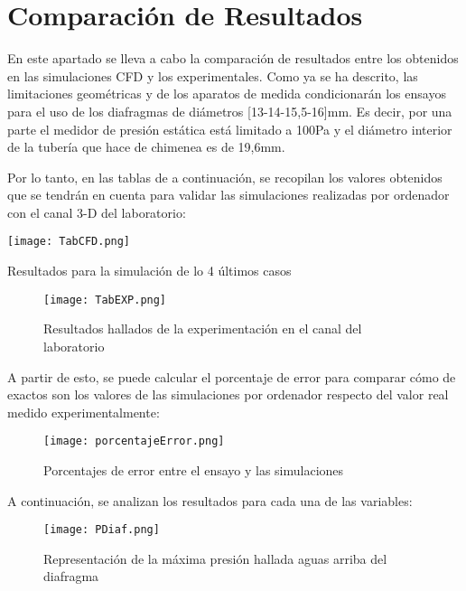 \label{ch:conclusiones}


\section{Comparación de Resultados}\label{sec:comparativa}

En este apartado se lleva a cabo la comparación de resultados entre los
obtenidos en las simulaciones CFD y los experimentales. Como ya se ha
descrito, las limitaciones geométricas y de los aparatos de medida
condicionarán los ensayos para el uso de los diafragmas de diámetros
{[}13-14-15,5-16{]}mm. Es decir, por una parte el medidor de presión
estática está limitado a 100Pa y el diámetro interior de la tubería que
hace de chimenea es de 19,6mm.

Por lo tanto, en las tablas de a continuación, se recopilan los valores
obtenidos que se tendrán en cuenta para validar las simulaciones
realizadas por ordenador con el canal 3-D del laboratorio:

\begin{table}
\centering
\texttt{[image: TabCFD.png]}
\caption{Resultados para la simulación de lo 4 últimos casos}
\label{tab:cfd}
\end{table}

\begin{figure}
\centering
\texttt{[image: TabEXP.png]}
\caption{Resultados hallados de la experimentación en el
canal del laboratorio}
\label{tab:exp}
\end{figure}

A partir de esto, se puede calcular el porcentaje de error para comparar
cómo de exactos son los valores de las simulaciones por ordenador
respecto del valor real medido experimentalmente:

\begin{figure}
\centering
\texttt{[image: porcentajeError.png]}
\caption{Porcentajes de error entre el ensayo y las simulaciones}
\label{fig:porcentajeError}
\end{figure}

A continuación, se analizan los resultados para cada una de las
variables:

\begin{figure}
\centering
\texttt{[image: PDiaf.png]}
\caption[Presión máxima aguas arriba del diafragma]{Representación de la máxima presión hallada aguas arriba del diafragma}
\label{fig:PDiaf}
\end{figure}


